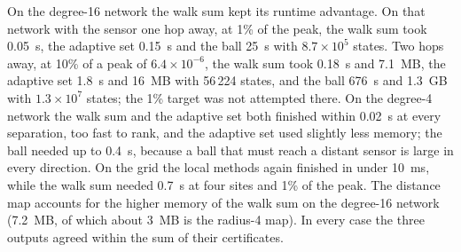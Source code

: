 \documentclass[aps,pra,superscriptaddress,floatfix,longbibliography,twocolumn]{revtex4-2}
\begin{document}
On the degree-16 network the walk sum kept its runtime advantage. On that network with the sensor one hop away, at 1\% of the peak, the walk sum took 0.05~s, the adaptive set 0.15~s and the ball 25~s with $8.7\times10^5$ states. Two hops away, at 10\% of a peak of $6.4\times10^{-6}$, the walk sum took 0.18~s and 7.1~MB, the adaptive set 1.8~s and 16~MB with 56\,224 states, and the ball 676~s and 1.3~GB with $1.3\times10^7$ states; the 1\% target was not attempted there. On the degree-4 network the walk sum and the adaptive set both finished within 0.02~s at every separation, too fast to rank, and the adaptive set used slightly less memory; the ball needed up to 0.4~s, because a ball that must reach a distant sensor is large in every direction. On the grid the local methods again finished in under 10~ms, while the walk sum needed 0.7~s at four sites and 1\% of the peak. The distance map accounts for the higher memory of the walk sum on the degree-16 network (7.2~MB, of which about 3~MB is the radius-4 map). In every case the three outputs agreed within the sum of their certificates.
\end{document}
